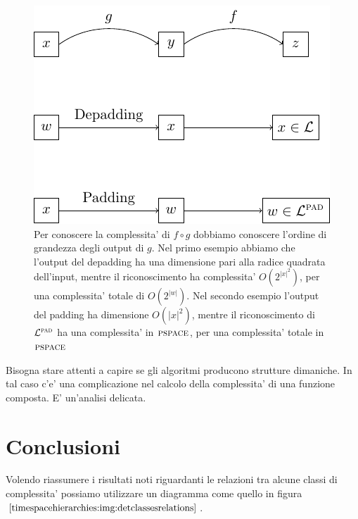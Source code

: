\begin{figure}[!h]
    \begin{center}
        \includegraphics{./img/timespacehierarchies/FunctionsComposition.pdf}
        \caption{Per conoscere la complessita' di $f \circ g$ dobbiamo conoscere l'ordine di
        grandezza degli output di $g$. Nel primo esempio abbiamo che l'output del depadding ha una
        dimensione pari alla radice quadrata dell'input, mentre il riconoscimento ha complessita'
        $O(2^{|x|^{2}})$, per una complessita' totale di $O(2^{|w|})$. Nel secondo esempio l'output
        del padding ha dimensione $O(|x|^{2})$, mentre il riconoscimento di $\mathcal{L}^{\textsc{pad}}$ ha una
        complessita' in $\textsc{pspace}$, per una complessita' totale in $\textsc{pspace}$}
    \end{center}
\end{figure}

Bisogna stare attenti a capire se gli algoritmi producono strutture dimaniche. In tal caso c'e' una
complicazione nel calcolo della complessita' di una funzione composta. E' un'analisi delicata.

\section{Conclusioni}

Volendo riassumere i risultati noti riguardanti le relazioni tra alcune classi di complessita'
possiamo utilizzare un diagramma come quello in figura $\ref{timespacehierarchies:img:detclassesrelations}$. 

